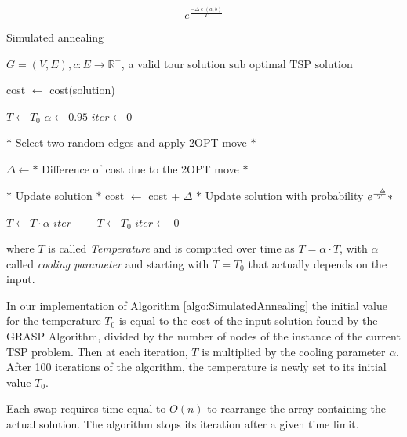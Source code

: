 \begin{equation*}
    e^{\frac{-\Delta \operatorname{c}(a,b)}{T}}
\end{equation*}

\begin{algorithm}[!h]
    \caption{Simulated annealing}\label{algo:SimulatedAnnealing}
    \begin{algorithmic}[1]
    \Require $G = (V,E), c:E \to \mathbb{R}^+$, a valid tour solution
    \Ensure $\text{sub optimal TSP solution}$

    \State cost $\gets$ cost(solution)

    \State $T \gets   T_0 $
    \State $ \alpha \gets  0.95 $
    \State $ iter \gets  0 $
   




    

    \State $*$ Select two random edges and apply 2OPT move $*$

    
    \State $\Delta \gets *$ Difference of cost due to the 2OPT move $*$  
    
    
    \State $*$ Update solution $*$
    \State cost $\gets$ cost + $\Delta$
    \Else 
    \State $*$ Update solution with probability $ e^{-\Delta \over T}*$

    \EndIf

    \State $T \gets T \cdot \alpha$
    \State $iter++ $
    \State $T \gets   T_0$
    \State $iter \gets  $ 0
    \EndIf
    

    \EndWhile

    \end{algorithmic}
\end{algorithm}

where $T$ is called \textit{Temperature} and is computed over time as $T = \alpha \cdot T$, with $\alpha$ called \textit{cooling parameter} and starting with $T = T_0$ that actually depends on the input.

In our implementation of Algorithm \ref{algo:SimulatedAnnealing} the initial value for the temperature $T_0$ is equal to the cost of the input solution found by the GRASP Algorithm, divided by the number of nodes of the instance of the current TSP problem. Then at each iteration, $T$ is multiplied by the cooling parameter $\alpha$. After 100 iterations of the algorithm, the temperature is newly set to its initial value $T_0$.

Each swap requires time equal to $O(n)$ to rearrange the array containing the actual solution.
The algorithm stops its iteration after a given time limit.

